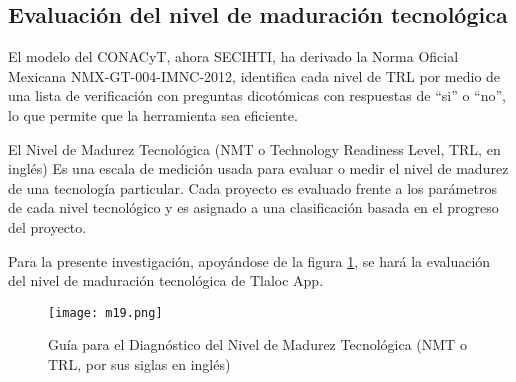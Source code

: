 \subsection{Evaluación del nivel de maduración tecnológica}

El modelo del CONACyT, ahora SECIHTI, ha derivado la Norma Oficial Mexicana NMX-GT-004-IMNC-2012, identifica cada nivel de TRL por medio de una lista de verificación con preguntas dicotómicas con respuestas de ``si'' o ``no'', lo que permite que la herramienta sea eficiente.


El Nivel de Madurez Tecnológica (NMT o Technology Readiness Level, TRL, en inglés) 
Es una escala de medición usada para evaluar o medir el nivel de madurez de una
tecnología particular. Cada proyecto es evaluado frente a los parámetros de cada
nivel tecnológico y es asignado a una clasificación basada en el progreso del
proyecto.

Para la presente investigación, apoyándose de la figura \ref{m19}, se hará la evaluación del nivel de maduración tecnológica de Tlaloc App.





\begin{figure}[h!]
\centering
  \texttt{[image: m19.png]}
  \caption{Guía para el Diagnóstico del Nivel de Madurez Tecnológica (NMT o TRL, por sus siglas en inglés)}
  \label{m19}
\end{figure}
